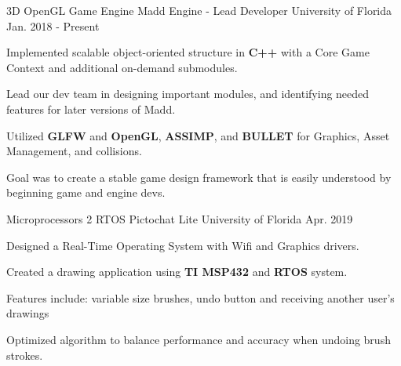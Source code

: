 \begin{cventries}
	
	\cventry
	{3D OpenGL Game Engine} %
	{Madd Engine - Lead Developer} %
	{University of Florida} %
	{Jan. 2018 - Present} %
	{ %
		\begin{cvitems}
			\setlength{\itemindent}{.125in}
			\item {Implemented scalable object-oriented structure in \textbf{C++} with a Core Game Context and additional on-demand submodules.}
			\item {Lead our dev team in designing important modules, and identifying needed features for later versions of Madd.}
			\item {Utilized \textbf{GLFW} and \textbf{OpenGL}, \textbf{ASSIMP}, and \textbf{BULLET} for Graphics, Asset Management, and collisions.}
			\item {Goal was to create a stable game design framework that is easily understood by beginning game and engine devs.}
		\end{cvitems}
	}
	
	
	\cventry
	{Microprocessors 2} %
	{RTOS Pictochat Lite} %
	{University of Florida} %
	{Apr. 2019} %
	{ %
		\begin{cvitems}
			\setlength{\itemindent}{.125in}
			\item {Designed a Real-Time Operating System with Wifi and Graphics drivers.}
			\item {Created a drawing application using \textbf{TI MSP432} and \textbf{RTOS} system.}
			\item {Features include: variable size brushes, undo button and receiving another user’s drawings}
			\item {Optimized algorithm to balance performance and accuracy when undoing brush strokes.}
		\end{cvitems}
	}

	
\end{cventries}
